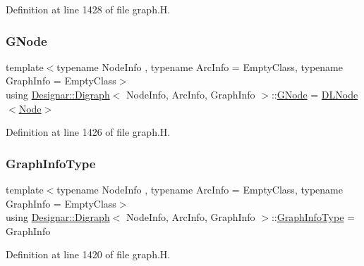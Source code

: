 Definition at line 1428 of file graph.\+H.

\mbox{\label{class_designar_1_1_digraph_a33b0d2b8820ada501522b0e67e63524a}} 
\subsubsection{\texorpdfstring{G\+Node}{GNode}}
{\footnotesize\ttfamily template$<$typename Node\+Info , typename Arc\+Info  = Empty\+Class, typename Graph\+Info  = Empty\+Class$>$ \\
using \hyperlink{class_designar_1_1_digraph}{Designar\+::\+Digraph}$<$ Node\+Info, Arc\+Info, Graph\+Info $>$\+::\hyperlink{class_designar_1_1_digraph_a33b0d2b8820ada501522b0e67e63524a}{G\+Node} =  \hyperlink{class_designar_1_1_d_l_node}{D\+L\+Node}$<$\hyperlink{class_designar_1_1_digraph_a4dc921c41a480b7946a04170e997d8ae}{Node}$>$\hspace{0.3cm}{\ttfamily [protected]}}



Definition at line 1426 of file graph.\+H.

\mbox{\label{class_designar_1_1_digraph_a2baffbb176ff86becd7452d2acc0ca74}} 
\subsubsection{\texorpdfstring{Graph\+Info\+Type}{GraphInfoType}}
{\footnotesize\ttfamily template$<$typename Node\+Info , typename Arc\+Info  = Empty\+Class, typename Graph\+Info  = Empty\+Class$>$ \\
using \hyperlink{class_designar_1_1_digraph}{Designar\+::\+Digraph}$<$ Node\+Info, Arc\+Info, Graph\+Info $>$\+::\hyperlink{class_designar_1_1_digraph_a2baffbb176ff86becd7452d2acc0ca74}{Graph\+Info\+Type} =  Graph\+Info}



Definition at line 1420 of file graph.\+H.

\mbox{\label{class_designar_1_1_digraph_a4dc921c41a480b7946a04170e997d8ae}} 
